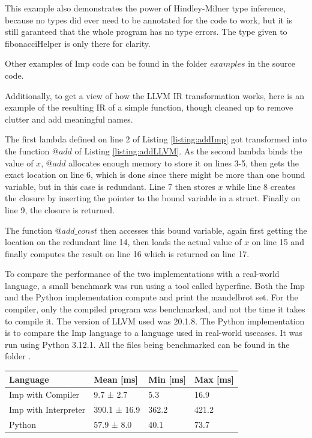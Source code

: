 \documentclass[12pt]{article}
\begin{document}
This example also demonstrates the power of Hindley-Milner type inference,
because no types did ever need to be annotated for the code to work,
but it is still garanteed that the whole program has no type errors.
The type given to fibonacciHelper is only there for clarity.

Other examples of Imp code can be found in the folder $examples$ in
the source code.

Additionally, to get a view of how the LLVM IR transformation works, here is
an example of the resulting IR of a simple function,
though cleaned up to remove clutter and add meaningful names.

\begin{minipage}{\linewidth}
	
	
\end{minipage}

The first lambda defined on line 2 of Listing \ref{listing:addImp} got transformed
into the function $@add$ of Listing \ref{listing:addLLVM}.
As the second lambda binds the value of $x$, $@add$ allocates
enough memory to store it on lines 3-5, then gets the exact location on line 6, which
is done since there might be more than one bound variable, but in this case is redundant.
Line 7 then stores $x$ while line 8 creates the closure by inserting the pointer to the bound
variable in a struct.
Finally on line 9, the closure is returned.

The function $@add\_const$ then accesses this bound variable, again first getting the
location on the redundant line 14, then loads the actual value of $x$ on line 15
and finally computes the result on line 16 which is returned on line 17.

To compare the performance of the two implementations with a real-world language,
a small benchmark was run using a tool called hyperfine\autocite{peterHyperfine2023}.
Both the Imp and the Python implementation compute and print the mandelbrot set.
For the compiler, only the compiled program was benchmarked, and not
the time it takes to compile it. The version of LLVM used was 20.1.8.
The Python implementation is to compare the Imp language to a language used in
real-world usecases. It was run using Python 3.12.1.
All the files being benchmarked can be found in the folder .

\begin{table}[H]
	\centering
	\begin{tabular}{|l|l|l|l|}
		\hline
		Language             & Mean [ms]    & Min [ms] & Max [ms] \\ \hline
		Imp with Compiler    & 9.7 ± 2.7    & 5.3      & 16.9     \\ \hline
		Imp with Interpreter & 390.1 ± 16.9 & 362.2    & 421.2    \\ \hline
		Python               & 57.9 ± 8.0   & 40.1     & 73.7     \\ \hline
	\end{tabular}
\end{table}
\end{document}
